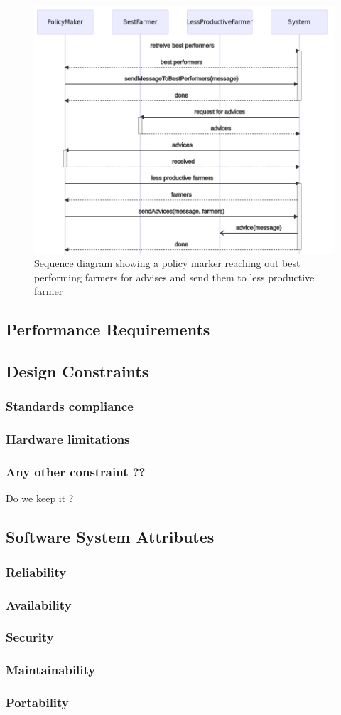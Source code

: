 \begin{figure}
	\centering
	\includegraphics[width=\textwidth]{Images/seq-policy-farmers.png}
	\caption{\label{fig:seq} Sequence diagram showing a policy marker reaching out best performing farmers for advises and send them to less productive farmer}
\end{figure}

\subsection{Performance Requirements}

\subsection{Design Constraints}
\subsubsection{Standards compliance}
\subsubsection{Hardware limitations}
\subsubsection{Any other constraint ??}
Do we keep it ?
\subsection{Software System Attributes}
\subsubsection{Reliability}
\subsubsection{Availability}
\subsubsection{Security}
\subsubsection{Maintainability}
\subsubsection{Portability}
